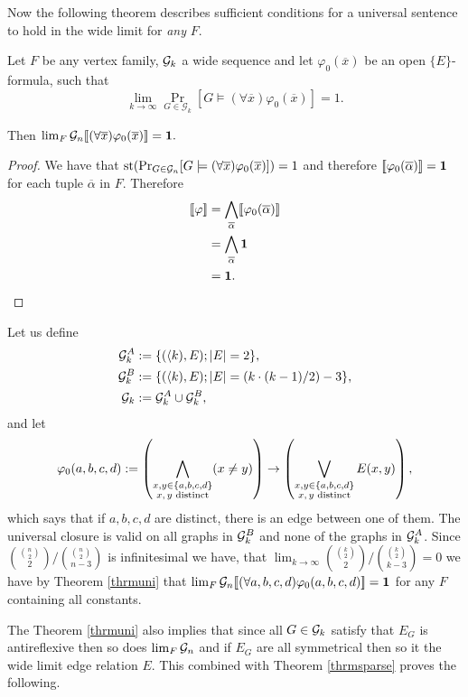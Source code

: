 Now the following theorem describes sufficient conditions for a universal sentence to hold in the wide limit for \textit{any} $F$.

\begin{thrm}\label{thrmuni}
Let $F$ be any vertex family, $\mathcal{G}_k$ a wide sequence and let $\varphi_0(\overline x)$ be an open $\{E\}$-formula, such that
\[\lim_{k\to\infty}\Pr_{G\in\mathcal{G}_k}[G\models(\forall \overline x)\varphi_0(\overline x)]=1.\]

Then $\lim_F \mathcal{G}_n [\![(\forall \overline x)\varphi_0(\overline x)]\!]=\textbf{1}.$


\end{thrm}

\begin{proof}
We have that $\text{st}(\Pr_{G\in\mathcal{G}_n}[G\models(\forall \overline x)\varphi_0(\overline x)])=1$ and therefore $[\![\varphi_0(\overline\alpha)]\!]=\textbf{1}$ for each tuple $\overline\alpha$ in $F$. Therefore
\begin{align}
[\![\varphi]\!]&=\bigwedge_{\overline\alpha}[\![\varphi_0(\overline\alpha)]\!]\\
&=\bigwedge_{\overline\alpha}\textbf{1}\\
&=\textbf{1}.
\end{align}
\end{proof}

\begin{exam}
Let us define
\begin{align}
\mathcal{G}_k^{A}&:=\{(\langle k),E);\left|{E}\right|=2\},\\
\mathcal{G}_k^{B}&:=\{(\langle k),E);\left|{E}\right|=(k\cdot(k-1)/2)-3\},\\
\mathcal{G}_k&:=\mathcal{G}_k^{A}\cup\mathcal{G}_k^{B},
\end{align}
and let 
\[\varphi_0(a,b,c,d):=\left(\bigwedge_{\substack{x, y\in\{a,b,c,d\}\\\text{$x,y$ distinct}}}(x\not=y)\right)\to\left(\bigvee_{\substack{x, y\in\{a,b,c,d\}\\\text{$x,y$ distinct}}}E(x,y)\right),\]
which says that if $a,b,c,d$ are distinct, there is an edge between one of them. The universal closure is valid on all graphs in $\mathcal{G}_k^B$ and none of the graphs in $\mathcal{G}_k^A$. Since $\binom{\binom{n}{2}}{2}/\binom{\binom{n}{2}}{n-3}$ is infinitesimal we have, that $\lim_{k\to\infty} \binom{\binom{k}{2}}{2}/\binom{\binom{k}{2}}{k-3}=0$ we have by Theorem \ref{thrmuni} that $\lim_F \mathcal{G}_n [\![(\forall a,b,c,d)\varphi_0(a,b,c,d)]\!]=\textbf{1}$ for any $F$ containing all constants.
\end{exam}

The Theorem \ref{thrmuni} also implies that since all $G\in\mathcal{G}_k$ satisfy that $E_G$ is antireflexive then so does $\lim_{F}\mathcal{G}_n$ and if $E_G$ are all symmetrical then so it the wide limit edge relation $E$. This combined with Theorem \ref{thrmsparse} proves the following.

